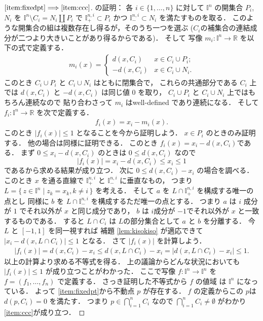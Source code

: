 \documentclass[leqno, a4paper, 12pt]{jsarticle}
\theoremstyle{plain}
\theoremstyle{definition}
\theoremstyle{remark}
\newcommand{\To}{\Longrightarrow}
\newcommand{\rr}{\mathbb{R}}
\newcommand{\yospfont}[1]{\mathbb{#1}}
\newcommand{\yocube}[1]{\yospfont{I}^{#1}}
\newcommand{\yocubesidep}[2]{\yospfont{I}^{#1, #2}_{+}}
\newcommand{\yocubesidem}[2]{\yospfont{I}^{#1, #2}_{-}}
\numberwithin{equation}{section}
\begin{document}
\begin{proof}
[$\ref{item:fixedpt}\To \ref{item:ccc}$]の証明：
各
$i\in \{1, \dots, n\}$
に対して
$\yocube{n}$
の開集合
$P_{i}$, 
$N_{i}$
を
$\yocube{n}\setminus C_{i}=N_{i}\coprod P_{i}$
で
$\yocubesidep{n}{i}\subset P_{i}$
かつ
$\yocubesidem{n}{i}\subset N_{i}$
を満たすものを取る．
このような開集合の組は複数存在し得るが，そのうち一つを選ぶ
($C_{i}$の補集合の連結成分が二つより大きいことがあり得るからである)．
そして
写像
$m_{i}\colon \yocube{n}\to \rr$
を以下の式で定義する．
\begin{align}
m_{i}(x)=
\begin{cases}
d(x, C_{i}) & \text{$x \in C_{i}\cup P_{i}$};\\
-d(x, C_{i}) & \text{$x\in C_{i} \cup N_{i}$}. 
\end{cases}
\end{align}
このとき
$C_{i}\cup P_{i}$
と
$ C_{i}\cup N_{i}$
はともに閉集合で，
これらの共通部分である
$C_{i}$
上では
$d(x, C_{i})$
と
$-d(x, C_{i})$
は同じ値
$0$
を取り，
$C_{i}\cup P_{i}$
と
$ C_{i}\cup N_{i}$
上ではもちろん連続なので
貼り合わさって
$m_{i}$
はwell-defined であり連続になる．
そして
$f_{i}\colon \yocube{n}\to \rr$
を次で定義する．
\begin{align}
f_{i}(x)=x_{i}-m_{i}(x).
\end{align}
このとき
$|f_{i}(x)|\le 1$
となることを今から証明しよう．
$x\in P_{i}$
のときのみ証明する．
他の場合は同様に証明できる．
このとき
$f_{i}(x)=x_{i}-d(x, C_{i})$である．
まず
$0\le x_{i}-d(x, C_{i})$
のときは
$0\le d(x, C_{i})$
なので
\[
|f_{i}(x)|=x_{i}-d(x, C_{i})\le x_{i}\le 1
\]
であるから求める結果が成り立つ．
次に
$0\le d(x, C_{i})-x_{i}$
の場合を調べる．
このとき
$x$
を通る直線で
$\yocubesidep{n}{i}$
と
$\yocubesidem{n}{i}$
に垂直なもの，
つまり
$L=\{\, z\in \yocube{n}\mid z_{k}=x_{k},   k\neq i\, \}$
を考える．
そして
$a$
を
$L\cap\yocubesidep{n}{i}$
を構成する唯一の点とし
同様に
$b$
を
$L\cap \yocubesidem{n}{i}$
を構成するただ唯一の点とする．
つまり
$a$
は
$i$
成分が
$1$
でそれ以外が
$x$
と同じ成分であり，
$b$
は
$i$成分が
$-1$でそれ以外が
$x$
と一致するものである．
すると
$L\cap C_{i}$
は
$L$の部分集合として
$a$
と
$b$
を分離する．
今
$L$
と
$[-1, 1]$
を同一視すれば
補題
\ref{lem:kisokiso}
が適応できて
$|x_{i}-d(x, L\cap C_{i})|\le 1$
となる．
さて
$|f_{i}(x)|$
を計算しよう．
\begin{align}
|f_{i}(x)|=d(x, C_{i})-x_{i}
\le d(x, L\cap C_{i})-x_{i}=|d(x, L\cap C_{i})-x_{i}|\le 1. 
\end{align}
以上の計算より求める不等式を得る．
上の議論からどんな状況においても
$|f_{i}(x)|\le 1$
が成り立つことがわかった．
ここで写像
$f\colon \yocube{n}\to \yocube{n}$
を
$f=(f_{1}, \dots, f_{n})$
で定義する．
さっき証明した不等式から
$f$
の値域
は
$\yocube{n}$
になっている．
よって
\ref{item:fixedpt}から不動点
$p$
が存在する．
$f$
の定義からこの
$p$は
$d(p, C_{i})=0$
を満たす．
つまり
$p\in \bigcap_{i=1}^{n}C_{i}$
なので
$\bigcap_{i=1}^{n}C_{i}\neq \emptyset$
がわかり
\ref{item:ccc}が成り立つ．




\end{proof}
\end{document}
